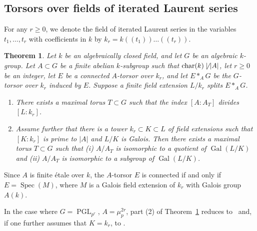\documentclass[12pt]{amsart}
\numberwithin{equation}{section}
\newtheorem{theorem}{Theorem}[section]
\theoremstyle{remark}
\newcommand{\Gal}{\operatorname{Gal}}
\newcommand{\PGL}{\operatorname{PGL}}
\newcommand{\Spec}{\operatorname{Spec}}
\newcommand{\Char}{\operatorname{char}}
\begin{document}
\subsection{Torsors over fields of iterated Laurent series}
For any $r \geqslant 0$, we denote the field of iterated Laurent series in the variables $t_1, \ldots, t_r$ with coefficients in $k$ by  $k_r = k(\!(t_1)\!)\dots (\!(t_r)\!)$. 

\begin{theorem}\label{thm.main}
Let $k$ be an algebraically closed field, and let $G$ be an algebraic $k$-group. Let $A \subset G$ be a finite abelian $k$-subgroup such that $\Char(k) \not\mid |A|$, let $r\geqslant 0$ be an integer, let $E$ be a connected $A$-torsor over $k_r$, and let $E*_AG$ be the $G$-torsor over $k_r$ induced by $E$. Suppose a finite field extension $L/k_r$ splits $E*_AG$. 

 \begin{enumerate}
 \item There exists a maximal torus $T \subset G$ such that the index
 $[A: A_T]$ divides $[L : k_r]$.

 \item Assume further that there is a tower $k_r \subset  K \subset L$ of field extensions such that $[K : k_r]$ is prime to $|A|$ and $L/K$ is Galois. Then there exists a maximal torus $T \subset G$ such that (i) $A/A_T$ is isomorphic to a quotient of $\Gal(L/K)$ and (ii) $A/A_T$ is isomorphic to a subgroup of $\Gal(L/K)$. 
 \end{enumerate}
 \end{theorem}

Since $A$ is finite \'etale over $k$, the $A$-torsor $E$ is connected if and only if $E=\Spec(M)$, where $M$ is a Galois field extension of $k_r$ with Galois group $A(k)$.

In the case where $G = \PGL_{p^r}$, $A = \mu_p^{2r}$, part (2) of Theorem~\ref{thm.main} reduces to~\cite[Proposition 2.1]{genus1} and, if one further assumes that $K = k_r$, to \cite[Theorem 5]{amitsur91}. 
\end{document}
